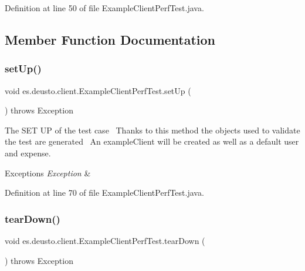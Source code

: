 Definition at line 50 of file Example\+Client\+Perf\+Test.\+java.



\subsection{Member Function Documentation}
\mbox{\label{classes_1_1deusto_1_1client_1_1_example_client_perf_test_a35485dd76fdde06d770768feb4523615}} 
\subsubsection{\texorpdfstring{set\+Up()}{setUp()}}
{\footnotesize\ttfamily void es.\+deusto.\+client.\+Example\+Client\+Perf\+Test.\+set\+Up (\begin{DoxyParamCaption}{ }\end{DoxyParamCaption}) throws Exception}

The S\+ET UP of the test case~\newline
Thanks to this method the objects used to validate the test are generated~\newline
An example\+Client will be created as well as a default user and expense. 
\begin{DoxyExceptions}{Exceptions}
{\em Exception} & \\
\hline
\end{DoxyExceptions}


Definition at line 70 of file Example\+Client\+Perf\+Test.\+java.

\mbox{\label{classes_1_1deusto_1_1client_1_1_example_client_perf_test_adaeb52fb119e1f3e299f9c2a61c10260}} 
\subsubsection{\texorpdfstring{tear\+Down()}{tearDown()}}
{\footnotesize\ttfamily void es.\+deusto.\+client.\+Example\+Client\+Perf\+Test.\+tear\+Down (\begin{DoxyParamCaption}{ }\end{DoxyParamCaption}) throws Exception}

